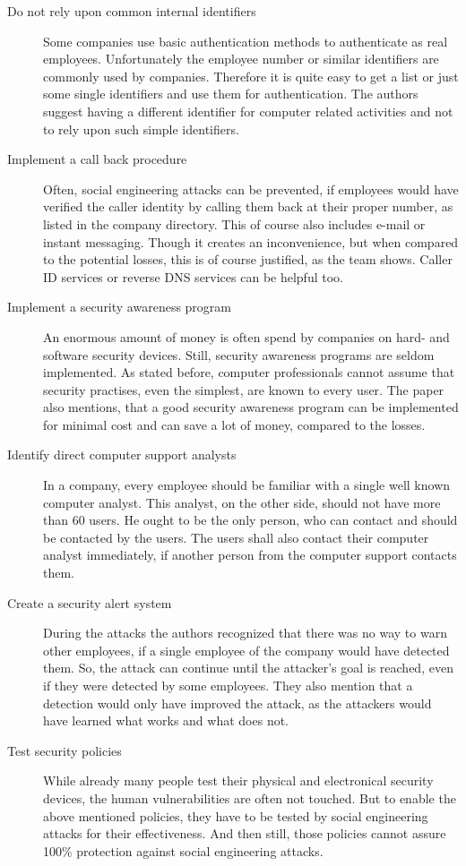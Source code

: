 \begin{description}
  \item[Do not rely upon common internal identifiers] Some companies use basic
  authentication methods to authenticate as real employees. Unfortunately the
  employee number or similar identifiers are commonly used by companies.
  Therefore it is quite easy to get a list or just some single identifiers and
  use them for authentication. The authors suggest having a different
  identifier for computer related activities and not to rely upon such simple
  identifiers.
  \item[Implement a call back procedure] Often, social engineering attacks can
  be prevented, if employees would have verified the caller identity by calling
  them back at their proper number, as listed in the company directory. This of
  course also includes e-mail or instant messaging. Though it creates an
  inconvenience, but when compared to the potential losses, this is of course
  justified, as the team shows. Caller ID services or reverse DNS services can
  be helpful too.
  \item[Implement a security awareness program] An enormous amount of money is
  often spend by companies on hard- and software security devices. Still, security
  awareness programs are seldom implemented. As stated before, computer
  professionals cannot assume that security practises, even the simplest, are
  known to every user. The paper also mentions, that a good security awareness
  program can be implemented for minimal cost and can save a lot of money,
  compared to the losses.
  \item[Identify direct computer support analysts] In a company, every employee
  should be familiar with a single well known computer analyst. This analyst, on
  the other side, should not have more than 60 users. He ought to be the only
  person, who can contact and should be contacted by the users. The users
  shall also contact their computer analyst immediately, if another person
  from the computer support contacts them.
  \item[Create a security alert system] During the attacks the authors 
  recognized that there was no way to warn other employees, if a single
  employee of the company would have detected them. So, the attack can
  continue until the attacker's goal is reached, even if they were detected by some
  employees. They also mention that a detection would only have improved the
  attack, as the attackers would have learned what works and what does
  not.
  \item[Test security policies] While already many people test their physical
  and electronical security devices, the human vulnerabilities are often not
  touched. But to enable the above mentioned policies, they have to be tested
  by social engineering attacks for their effectiveness. And then still, those
  policies cannot assure 100\% protection against social engineering attacks.
\end{description}

